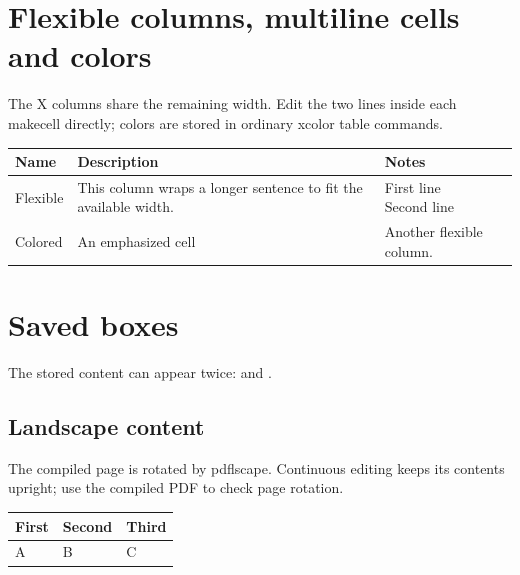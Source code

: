 \documentclass{article}
\begin{document}
\section{Flexible columns, multiline cells and colors}
The X columns share the remaining width. Edit the two lines inside each
makecell directly; colors are stored in ordinary xcolor table commands.
\begin{tabularx}{\linewidth}{@{}lXX@{}}
\toprule
\rowcolor{blue!10} Name & Description & Notes \\
\midrule
Flexible & This column wraps a longer sentence to fit the available width.
 & \makecell[l]{First line\\Second line} \\
Colored & \cellcolor{green!15}An emphasized cell & Another flexible column. \\
\bottomrule
\end{tabularx}

\section{Saved boxes}
\newsavebox{\samplebox}
The stored content can appear twice: \usebox{\samplebox} and \usebox{\samplebox}.

\begin{landscape}
\section{Landscape content}
The compiled page is rotated by pdflscape. Continuous editing keeps its
contents upright; use the compiled PDF to check page rotation.
\begin{tabular}{lll}\toprule First&Second&Third\\\midrule A&B&C\\\bottomrule\end{tabular}
\end{landscape}
\end{document}
